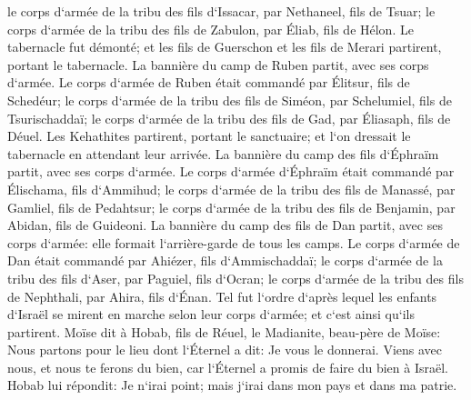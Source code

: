 \verse le corps d`armée de la tribu des fils d`Issacar, par Nethaneel, fils de Tsuar; 
\verse le corps d`armée de la tribu des fils de Zabulon, par Éliab, fils de Hélon. 
\verse Le tabernacle fut démonté; et les fils de Guerschon et les fils de Merari partirent, portant le tabernacle. 
\verse La bannière du camp de Ruben partit, avec ses corps d`armée. Le corps d`armée de Ruben était commandé par Élitsur, fils de Schedéur; 
\verse le corps d`armée de la tribu des fils de Siméon, par Schelumiel, fils de Tsurischaddaï; 
\verse le corps d`armée de la tribu des fils de Gad, par Éliasaph, fils de Déuel. 
\verse Les Kehathites partirent, portant le sanctuaire; et l`on dressait le tabernacle en attendant leur arrivée. 
\verse La bannière du camp des fils d`Éphraïm partit, avec ses corps d`armée. Le corps d`armée d`Éphraïm était commandé par Élischama, fils d`Ammihud; 
\verse le corps d`armée de la tribu des fils de Manassé, par Gamliel, fils de Pedahtsur; 
\verse le corps d`armée de la tribu des fils de Benjamin, par Abidan, fils de Guideoni. 
\verse La bannière du camp des fils de Dan partit, avec ses corps d`armée: elle formait l`arrière-garde de tous les camps. Le corps d`armée de Dan était commandé par Ahiézer, fils d`Ammischaddaï; 
\verse le corps d`armée de la tribu des fils d`Aser, par Paguiel, fils d`Ocran; 
\verse le corps d`armée de la tribu des fils de Nephthali, par Ahira, fils d`Énan. 
\verse Tel fut l`ordre d`après lequel les enfants d`Israël se mirent en marche selon leur corps d`armée; et c`est ainsi qu`ils partirent. 
\verse Moïse dit à Hobab, fils de Réuel, le Madianite, beau-père de Moïse: Nous partons pour le lieu dont l`Éternel a dit: Je vous le donnerai. Viens avec nous, et nous te ferons du bien, car l`Éternel a promis de faire du bien à Israël. 
\verse Hobab lui répondit: Je n`irai point; mais j`irai dans mon pays et dans ma patrie. 
